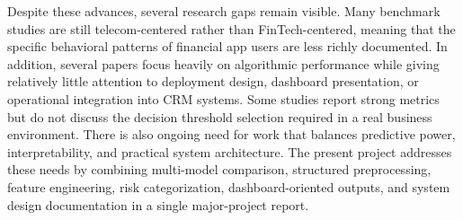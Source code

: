 Despite these advances, several research gaps remain visible. Many benchmark studies are still telecom-centered rather than FinTech-centered, meaning that the specific behavioral patterns of financial app users are less richly documented. In addition, several papers focus heavily on algorithmic performance while giving relatively little attention to deployment design, dashboard presentation, or operational integration into CRM systems. Some studies report strong metrics but do not discuss the decision threshold selection required in a real business environment. There is also ongoing need for work that balances predictive power, interpretability, and practical system architecture. The present project addresses these needs by combining multi-model comparison, structured preprocessing, feature engineering, risk categorization, dashboard-oriented outputs, and system design documentation in a single major-project report.
